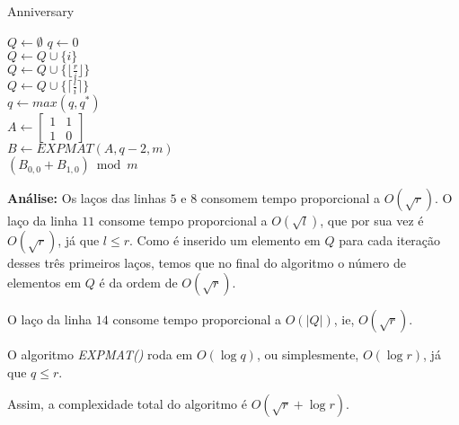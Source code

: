 \begin{algorithm}
\caption{Anniversary}
\begin{algorithmic}[1]

\State $Q \gets \emptyset$
\State $q \gets 0$
\\
\State $Q \gets Q\cup\{i\}$
\EndFor
\\
\State $Q \gets Q\cup\{\lfloor \frac{r}{i} \rfloor \}$
\EndFor
\\
\State $Q \gets Q\cup\{\lceil \frac{l}{i} \rceil \}$
\EndFor
\\
\State $q \gets max(q, q^*)$
\EndIf
\EndFor
\\
\State $A \gets 
\begin{bmatrix}
       1 & 1           \\[0.3em]
       1 & 0
\end{bmatrix}
$
\\
\State $B \gets EXPMAT(A, q-2, m) $
\\
\State \Return $(B_{0,0}+B_{1,0}) \bmod m$
\EndProcedure
\end{algorithmic}
\end{algorithm}


\textbf{Análise:}
Os laços das linhas $5$ e $8$ consomem tempo proporcional a $O(\sqrt{r})$. O laço da linha $11$ consome tempo proporcional a $O(\sqrt{l})$, que por sua vez é $O(\sqrt{r})$, já que $l\leq r$. Como é inserido um elemento em $Q$ para cada iteração desses três primeiros laços, temos que no final do algoritmo o número de elementos em $Q$ é da ordem de $O(\sqrt{r})$.

O laço da linha $14$ consome tempo proporcional a $O(|Q|)$, ie, $O(\sqrt{r})$.

O algoritmo \textit{EXPMAT()} roda em $O(\log q)$, ou simplesmente, $O(\log r)$, já que $q \leq r$.

Assim, a complexidade total do algoritmo é $O(\sqrt{r} + \log r)$.
